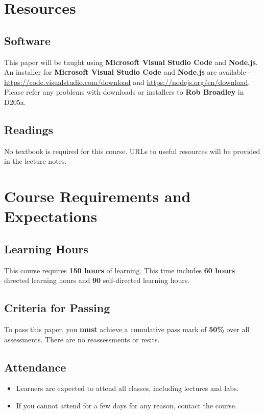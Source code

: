 \documentclass{article}
\begin{document}
\section*{Resources}

\subsection*{Software}
This paper will be taught using \textbf{Microsoft Visual Studio Code} and \textbf{Node.js}. An installer for \textbf{Microsoft Visual Studio Code} and \textbf{Node.js} are available - \href{https://code.visualstudio.com/download}{https://code.visualstudio.com/download} and \href{https://nodejs.org/en/download}{https://nodejs.org/en/download}. Please refer any problems with downloads or installers to \textbf{Rob Broadley} in D205a.

\subsection*{Readings}
No textbook is required for this course. URLs to useful resources will be provided in the lecture notes. 

\section*{Course Requirements and Expectations}

\subsection*{Learning Hours}
This course requires \textbf{150 hours} of learning. This time includes \textbf{60 hours} directed learning hours and \textbf{90} self-directed learning hours.

\subsection*{Criteria for Passing}
To pass this paper, you \textbf{must} achieve a cumulative pass mark of \textbf{50\%} over all assessments. There are no reassessments or resits.

\subsection*{Attendance}
\begin{itemize}
	\item Learners are expected to attend all classes, including lectures and labs.
	\item If you cannot attend for a few days for any reason, contact the course.
\end{itemize}
\end{document}
